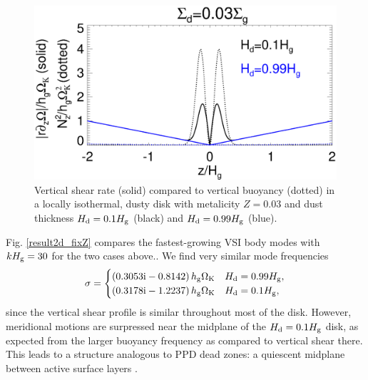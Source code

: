 \begin{figure}
  \includegraphics[width=\linewidth]{figures/compare_vshear_Nz2_fixZ} 
  \caption{Vertical shear rate (solid) compared to vertical buoyancy
    (dotted) in a locally isothermal, dusty disk 
    with metalicity $Z=0.03$ and dust thickness $H_\mathrm{d}=0.1H_\mathrm{g}$
    (black) and $H_\mathrm{d}=0.99H_\mathrm{g}$ (blue). 
    \label{compare_vshear_fixZ}
    }
\end{figure}

Fig. \ref{result2d_fixZ} compares the fastest-growing VSI body modes  
with $kH_\mathrm{g}=30$ for the two cases above..   
We find very similar mode 
frequencies 
\begin{align*}
  \sigma = \begin{cases}
    \left(0.3053\mathrm{i} - 0.8142\right)h_\mathrm{g}\Omega_{\rm K} & H_\mathrm{d}=0.99H_\mathrm{g}, \\
    \left(0.3178\mathrm{i} - 1.2237\right)h_\mathrm{g}\Omega_{\rm K} & H_\mathrm{d}=0.1H_\mathrm{g},
  \end{cases}
\end{align*}
since the vertical shear profile is similar throughout most of the
disk. However, meridional motions are surpressed near the midplane of
the $H_\mathrm{d}=0.1H_\mathrm{g}$ disk, as expected from the larger buoyancy frequency
as compared to vertical shear there. This leads to a structure
analogous to PPD dead zones: a quiescent midplane between active
surface layers \citep{gammie96}.  


